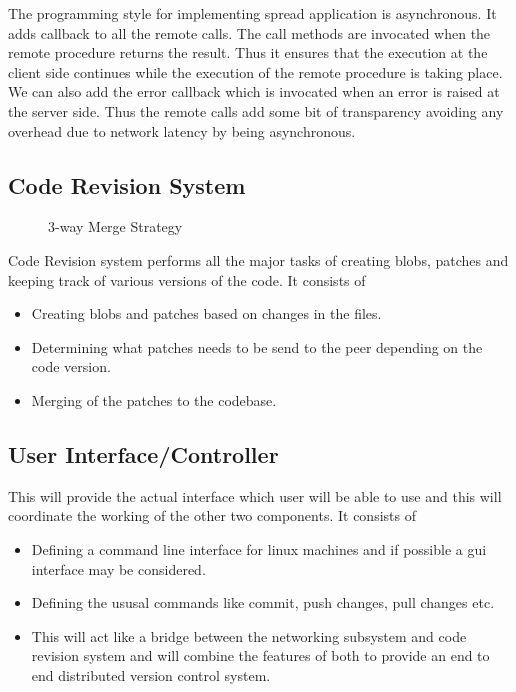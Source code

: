 \documentclass[12pt]{article}
\begin{document}
The programming style for implementing spread application is asynchronous. It
adds callback to all the remote calls. The call methods are invocated when the
remote procedure returns the result. Thus it ensures that the execution at the
client side continues while the execution of the remote procedure is taking
place. We can also add the error callback which is invocated when an error is
raised at the server side. Thus the remote calls add some bit of transparency
avoiding any overhead due to network latency by being asynchronous.

\subsection{Code Revision System}
\begin{wrapfigure}[8]{r}{9cm}
\centering
{}
\caption{3-way Merge Strategy}
\end{wrapfigure}
Code Revision system performs all the major tasks of creating blobs, patches and
keeping track of various versions of the code. It consists of
\begin{itemize}
\item Creating blobs and patches based on changes in the files.
\item Determining what patches needs to be send to the peer depending on the
  code version.
\item Merging of the patches to the codebase.
\end{itemize}
\subsection{User Interface/Controller}
This will provide the actual interface which user will be able to use and this
will coordinate the working of the other two components.
It consists of
\begin{itemize}
\item Defining a command line interface for linux machines and if possible a
  gui interface may be considered.
\item Defining the ususal commands like commit, push changes, pull changes
  etc.
\item This will act like a bridge between the networking subsystem and code
  revision system and will combine the features of both to provide an end to
  end distributed version control system.
\end{itemize}
\end{document}
